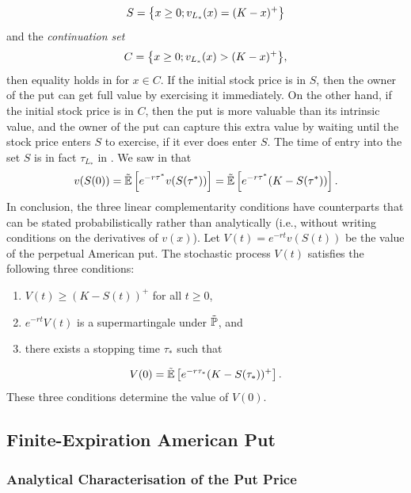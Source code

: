 \begin{equation} \label{StoppingSetDefinition}
	S = \set[\big]{x \ge 0; v_{L_*}(x) = (K-x)^+}
\end{equation}
and the \textit{continuation set}
\begin{equation} \label{ContinuationSetDefinition}
	C = \set[\big]{x \ge 0; v_{L_*}(x) > (K-x)^+},
\end{equation}
then equality holds in  for \(x \in C\). If the initial stock price is in \(S\), then the owner of the put can get full value by exercising it immediately. On the other hand, if the initial stock price is in \(C\), then the put is more valuable than its intrinsic value, and the owner of the put can capture this extra value by waiting until the stock price enters \(S\) to exercise, if it ever does enter \(S\). The time of entry into the set \(S\) is in fact \(\tau_{L_*}\) in . We saw in  that
\begin{equation*}
	v(S(0)) = \tilde{\E} \left[ e^{-r\tau^*} v(S(\tau^*)) \right] = \tilde{\E} \left[ e^{-r\tau^*} (K - S(\tau^*)) \right].
\end{equation*}
In conclusion, the three linear complementarity conditions have counterparts that can be stated probabilistically rather than analytically (i.e., without writing conditions on the derivatives of \(v(x)\)). Let \(V(t) = e^{-rt}v(S(t))\) be the value of the perpetual American put. The stochastic process \(V(t)\) satisfies the following three conditions:
\begin{enumerate}[label=(\roman*)]
	\item \(V(t) \ge (K - S(t))^+\) for all \(t \ge 0\),
	\item \(e^{-rt}V(t)\) is a supermartingale under \(\tilde{\Prob}\), and
	\item there exists a stopping time \(\tau_*\) such that
\end{enumerate}
\begin{equation*}
	V(0) = \tilde{\E} \left[ e^{-r\tau_*} (K - S(\tau_*))^+ \right].
\end{equation*}
These three conditions determine the value of \(V(0)\).

\subsection{Finite-Expiration American Put}

\subsubsection{Analytical Characterisation of the Put Price}

